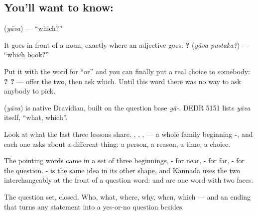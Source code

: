 \subsection*{You'll want to know: }
\textbf{} (\emph{yāva}) — \textquotedblleft{}which?\textquotedblright{}

It goes in front of a noun, exactly where an adjective goes: \textbf{ ?} (\emph{yāva pustaka?}) — \textquotedblleft{}which book?\textquotedblright{}

Put it with the word for \textquotedblleft{}or\textquotedblright{} and you can finally put a real choice to somebody: \textbf{  ?  ?} — offer the two, then ask which. Until this word there was no way to ask anybody to pick.

\begin{cousinweb}
\textbf{} (\emph{yāva}) is native Dravidian, built on the question base \emph{yā-}. DEDR 5151 lists \emph{yāva} itself, \textquotedblleft{}what, which\textquotedblright{}.
\end{cousinweb}

\begin{grammarlens}[title={Grammar Lens: the ya- family, and what each member asks}]
Look at what the last three lessons share. , , ,  — a whole family beginning \textbf{-}, and each one asks about a different thing: a person, a reason, a time, a choice.

The pointing words came in a set of three beginnings, - for near, - for far, - for the question. - is the same idea in its other shape, and Kannada uses the two interchangeably at the front of a question word:  and  are one word with two faces.
\end{grammarlens}

\begin{grammarlens}[title={What you've built}]
The question set, closed. Who, what, where, why, when, which — and an ending that turns any statement into a yes-or-no question besides.
\end{grammarlens}

